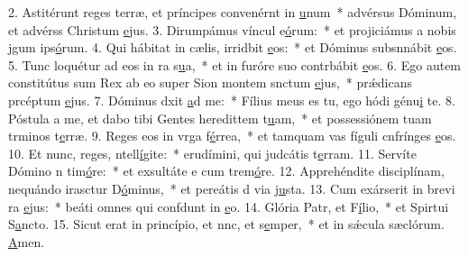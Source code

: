 2. Astitérunt reges terræ, et príncipes convenérnt in \uline{u}num~* advérsus Dóminum, et advérss Christum \uline{e}jus.
3. Dirumpámus víncul e\uline{ó}rum:~* et projiciámus a nobis jgum ips\uline{ó}rum.
4. Qui hábitat in cælis, irridbit \uline{e}os:~* et Dóminus subsnnábit \uline{e}os.
5. Tunc loquétur ad eos in ra s\uline{u}a,~* et in furóre suo contrbábit \uline{e}os.
6. Ego autem constitútus sum Rex ab eo super Sion montem snctum \uline{e}jus,~* prǽdicans prcéptum \uline{e}jus.
7. Dóminus dxit \uline{a}d me:~* Fílius meus es tu, ego hódi génu\uline{i} te.
8. Póstula a me, et dabo tibi Gentes heredittem t\uline{u}am,~* et possessiónem tuam trminos t\uline{e}rræ.
9. Reges eos in vrga f\uline{é}rrea,~* et tamquam vas fíguli cnfrínges \uline{e}os.
10. Et nunc, reges, ntell\uline{í}gite:~* erudímini, qui judcátis t\uline{e}rram.
11. Servíte Dómino n tim\uline{ó}re:~* et exsultáte e cum trem\uline{ó}re.
12. Apprehéndite disciplínam, nequándo irasctur D\uline{ó}minus,~* et pereátis d via j\uline{u}sta.
13. Cum exárserit in brevi ra \uline{e}jus:~* beáti omnes qui confdunt in \uline{e}o.
14. Glória Patr, et F\uline{í}lio,~* et Spirtui S\uline{a}ncto.
15. Sicut erat in princípio, et nnc, et s\uline{e}mper,~* et in sǽcula sæclórum. \uline{A}men.

